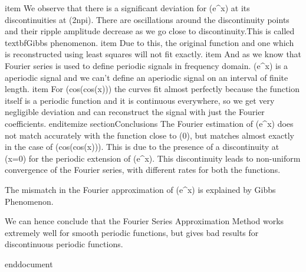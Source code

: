     item
    We observe that there is a significant deviation for (e^{x}) at its discontinuities at (2npi). There are oscillations around the discontinuity points and their ripple amplitude decrease as we go close to discontinuity.This is called textbf{Gibbs phenomenon}.
    item
    Due to this, the original function and one which is reconstructed using
    least squares will not fit exactly.
    item
    And as we know that Fourier series is used to define periodic signals in frequency domain. (e^{x}) is a aperiodic signal and we can't define an aperiodic signal on an interval of finite length.
    item
    For (cos(cos(x))) the curves fit almost perfectly because the function itself is a periodic function and it is continuous everywhere, so we get very negligible deviation and can reconstruct the signal with just the Fourier coefficients.
end{itemize}
section{Conclusions}
The Fourier estimation of (e^x) does not match accurately with the function close to (0), but matches almost exactly in the case of (cos(cos(x))). This is due to the presence of a discontinuity at (x=0) for the periodic extension of (e^x). This discontinuity leads to non-uniform convergence of the
Fourier series, with different rates for both the functions.

The mismatch in the Fourier approximation of (e^x) is explained by Gibbs Phenomenon.

We can hence conclude that the Fourier Series Approximation Method works extremely well for smooth periodic functions, but gives bad results for discontinuous periodic functions.

end{document}